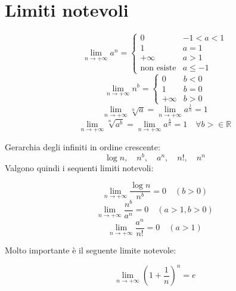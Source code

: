 \documentclass{article}
\begin{document}
\section*{Limiti notevoli}
\begin{equation}
    \lim_{n\to+\infty}a^n=
    \begin{cases}
        0                 & -1<a<1  \\
        1                 & a=1     \\
        +\infty           & a>1     \\
        \text{non esiste} & a\leq-1
    \end{cases}
\end{equation}
\begin{equation}
    \lim_{n\to+\infty}n^b=
    \begin{cases}
        0       & b<0 \\
        1       & b=0 \\
        +\infty & b>0
    \end{cases}
\end{equation}
\begin{equation}
    \lim_{n\to+\infty}\sqrt[n]{a}=\lim_{n\to+\infty}a^\frac{1}{n}=1
\end{equation}
\begin{equation}
    \lim_{n\to+\infty}\sqrt[n]{a^b}=\lim_{n\to+\infty}a^\frac{b}{n}=1\quad\forall b>\in\mathbb{R}
\end{equation}
\begin{center}
    Gerarchia degli infiniti in ordine crescente:
    \[\log n, \quad n^b, \quad a^n, \quad n!, \quad n^n \]
    Valgono quindi i sequenti limiti notevoli:
\end{center}
\begin{equation}
    \lim_{n\to+\infty}\frac{\log n}{n^b}=0 \quad (b>0)
\end{equation}
\begin{equation}
    \lim_{n\to+\infty}\frac{n^b}{a^n}=0 \quad (a>1,b>0)
\end{equation}
\begin{equation}
    \lim_{n\to+\infty}\frac{a^n}{n!}=0 \quad (a>1)
\end{equation}
\begin{center}
    Molto importante è il seguente limite notevole:
\end{center}
\begin{equation}
    \lim_{n\to+\infty}\left(1+\frac{1}{n}\right)^n=e
\end{equation}
\end{document}
